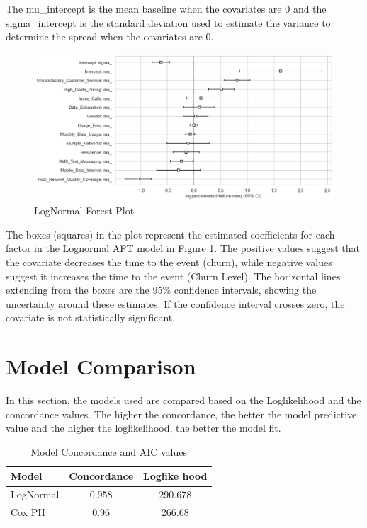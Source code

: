 \documentclass[doublespacing,12pt]{report}
\begin{document}
{\normalsize{\noindent The mu\_intercept is the mean baseline when the covariates are 0 and the sigma\_intercept is the standard deviation used to estimate the variance to determine the spread when the covariates are 0.}

\begin{figure}[H]
    \centering
    \includegraphics[width=1\linewidth]{Figure 4/4.4.png}
    \caption{LogNormal Forest Plot}
    \label{LogNormal}
\end{figure}

\normalsize{\noindent The boxes (squares) in the plot represent the estimated coefficients for each factor in the Lognormal AFT model in Figure \ref{LogNormal}. The positive values suggest that the covariate decreases the time to the event (churn), while negative values suggest it increases the time to the event (Churn Level). The horizontal lines extending from the boxes are the 95\% confidence intervals, showing the uncertainty around these estimates. If the confidence interval crosses zero, the covariate is not statistically significant.}

\section{Model Comparison}

\normalsize{\noindent In this section, the models used are compared based on the Loglikelihood and the concordance values. The higher the concordance, the better the model predictive value and the higher the loglikelihood, the better the model fit.}

	\begin{table}[H]
			\centering
			\begin{tabular}{lcc}
				\toprule
				\textbf{Model} & \textbf{Concordance} & \textbf{Loglike hood}\\
				\midrule
				LogNormal& 0.958& 	290.678\\
				Cox PH & 0.96& 	266.68\\
				\bottomrule
			\end{tabular}
			\caption{Model Concordance and AIC values}
			\label{Table 2}
			

\end{table}}
\end{document}
